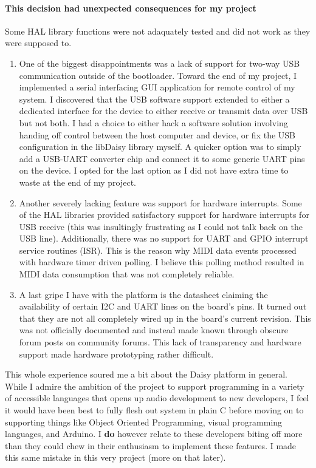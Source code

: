 \documentclass[acmlarge,screen]{acmart}
\begin{document}
	\paragraph{This decision had unexpected consequences for my project} Some HAL library functions were not adaquately tested and did not work as they were supposed to.

	\begin{enumerate}
	\item One of the biggest disappointments was a lack of support for two-way USB communication outside of the bootloader. Toward the end of my project, I implemented a serial interfacing GUI application for remote control of my system. I discovered that the USB software support extended to either a dedicated interface for the device to either receive or transmit data over USB but not both. I had a choice to either hack a software solution involving handing off control between the host computer and device, or fix the USB configuration in the libDaisy library myself. A quicker option was to simply add a USB-UART converter chip and connect it to some generic UART pins on the device. I opted for the last option as I did not have extra time to waste at the end of my project.
	\item Another severely lacking feature was support for hardware interrupts. Some of the HAL libraries provided satisfactory support for hardware interrupts for USB receive (this was insultingly frustrating as I could not talk back on the USB line). Additionally, there was no support for UART and GPIO interrupt service routines (ISR). This is the reason why MIDI data events processed with hardware timer driven polling. I believe this polling method resulted in MIDI data consumption that was not completely reliable.
	\item A last gripe I have with the platform is the datasheet claiming the availability of certain I2C and UART lines on the board's pins. It turned out that they are not all completely wired up in the board's current revision. This was not officially documented and instead made known through obscure forum posts on community forums. This lack of transparency and hardware support made hardware prototyping rather difficult.
	\end{enumerate}

	This whole experience soured me a bit about the Daisy platform in general. While I admire the ambition of the project to support programming in a variety of accessible languages that opens up audio development to new developers, I feel it would have been best to fully flesh out system in plain C before moving on to supporting things like Object Oriented Programming, visual programming languages, and Arduino. I \textbf{do} however relate to these developers biting off more than they could chew in their enthusiasm to implement these features. I made this same mistake in this very project (more on that later).
\end{document}
